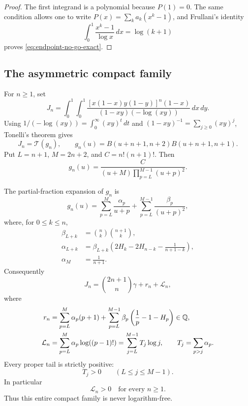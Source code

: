 \begin{proof}
The first integrand is a polynomial because \(P(1)=0\).  The same condition
allows one to write \(P(x)=\sum_ka_k(x^k-1)\), and Frullani's identity
\[
 \int_0^1\frac{x^k-1}{\log x}\,dx=\log(k+1)
\]
proves \eqref{eq:endpoint-no-go-exact}.
\end{proof}

\subsection{The asymmetric compact family}

For \(n\ge1\), set
\begin{equation}\label{eq:asymmetric-Jn}
 J_n=\int_0^1\!\int_0^1
 \frac{[x(1-x)y(1-y)]^n(1-x)}
 {(1-xy)(-\log(xy))}\,dx\,dy.
\end{equation}
Using
\(1/(-\log(xy))=\int_0^\infty(xy)^t\,dt\) and
\((1-xy)^{-1}=\sum_{j\ge0}(xy)^j\), Tonelli's theorem gives
\begin{equation}\label{eq:Jn-floor-beta}
 J_n=\mathcal T(g_n),\qquad
 g_n(u)=B(u+n+1,n+2)B(u+n+1,n+1).
\end{equation}
Put \(L=n+1\), \(M=2n+2\), and \(C=n!(n+1)!\).  Then
\begin{equation}\label{eq:gn-rational-form}
 g_n(u)=\frac{C}{(u+M)\prod_{p=L}^{M-1}(u+p)^2}.
\end{equation}

\begin{theorem}
\label{thm:Jn-exact-strict-contamination}
The partial-fraction expansion of \(g_n\) is
\[
 g_n(u)=\sum_{p=L}^{M}\frac{\alpha_p}{u+p}
       +\sum_{p=L}^{M-1}\frac{\beta_p}{(u+p)^2},
\]
where, for \(0\le k\le n\),
\begin{align}
 \beta_{L+k}
 &=\binom nk\binom{n+1}{k},
 \label{eq:Jn-beta}\\
 \alpha_{L+k}
 &=\beta_{L+k}\left(
 2H_k-2H_{n-k}-\frac1{n+1-k}\right),
 \label{eq:Jn-alpha}\\
 \alpha_M&=\frac1{n+1}.
 \label{eq:Jn-alpha-last}
\end{align}
Consequently
\begin{equation}\label{eq:Jn-exact-linear-form}
 J_n=\binom{2n+1}{n}\gamma+r_n+\mathcal L_n,
\end{equation}
where
\begin{align}
 r_n
 &=\sum_{p=L}^{M}\alpha_p(p+1)
   +\sum_{p=L}^{M-1}\beta_p
      \left(\frac1p-1-H_p\right)\in\mathbb Q,
 \label{eq:Jn-rational-part}\\
 \mathcal L_n
 &=\sum_{p=L}^{M}\alpha_p\log((p-1)!)
   =\sum_{j=L}^{M-1}T_j\log j,
 \qquad
 T_j=\sum_{p>j}\alpha_p.
 \label{eq:Jn-log-part}
\end{align}
Every proper tail is strictly positive:
\begin{equation}\label{eq:Jn-positive-tails}
 T_j>0\qquad(L\le j\le M-1).
\end{equation}
In particular
\begin{equation}\label{eq:Jn-log-positive}
 \boxed{\mathcal L_n>0\quad\text{for every }n\ge1.}
\end{equation}
Thus this entire compact family is never logarithm-free.
\end{theorem}

